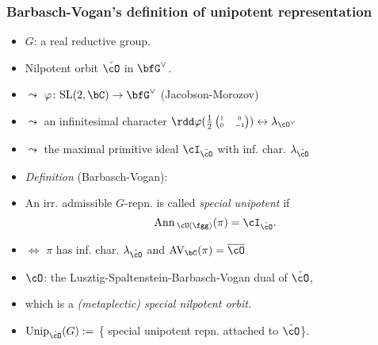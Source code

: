 \documentclass[t,mathserif,11pt,usenames,dvipsnames]{beamer}
\theoremstyle{plain}
\theoremstyle{definition}
\newcommand{\AV}{\mathrm{AV}}
\def\Ann{{\mathrm{Ann}\,}}
\def\SL{{\mathrm{SL}}}
\def\Unip{{\mathrm{Unip}}}
\def\half{{\frac{1}{2}}}
\def\ckcO{{\check{\cO}}}
\def\blue{\color{blue}}
\let\oldemph\emph
\def\emph#1{\oldemph{\blue #1}}
\begin{document}
    
    \begin{frame}[label=DU]
        \frametitle{Barbasch-Vogan's definition of unipotent representation}
        \begin{itemize}[<+->]
            \item[] $G$: a real reductive group.
            \item[]  Nilpotent orbit $\ckcO$ in  
            $\bfG^\vee$.  
            \item[] \hspace{4em} $\leadsto$ $\varphi\colon \SL(2,\bC)\rightarrow \bfG^\vee$
            (Jacobson-Morozov)
            \item[] \hspace{4em} $\leadsto$ an infinitesimal character $\rdd\varphi({\half
            \tiny\begin{pmatrix} 1 & 0 \\ 0 & -1\\ \end{pmatrix} })\leftrightarrow
            \lambda_{\cO^\vee}$  
            
            \item[] \hspace{4em} $\leadsto$ the maximal primitive ideal $\cI_\ckcO$ with
            inf. char.  $\lambda_{\ckcO}$
            \item  \emph{Definition} (Barbasch-Vogan):
            \item [] An irr. admissible $G$-repn. is called 
            \emph{special unipotent} if 
            \[
            \Ann_{\cU(\fgg)}(\pi) = \cI_{\ckcO}.
            \]
            \item[]
            $\Longleftrightarrow$ $\pi$ has inf. char. $\lambda_{\ckcO}$ and  
            $\AV_\bC(\pi) = \overline{\cO}$
            \item $\cO$: the  Lusztig-Spaltenstein-Barbasch-Vogan dual of $\ckcO$,
            \item[] which is a \emph{(metaplectic) special nilpotent orbit.}
            \item $\Unip_{\ckcO}(G):=$ \{ special unipotent repn. attached to $\ckcO$\}. 
        \end{itemize}
    \end{frame}
    
\end{document}
